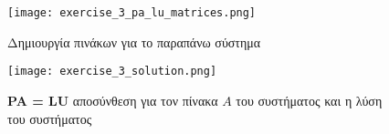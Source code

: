 \documentclass[First Project.tex]{subfiles}
\begin{document}
\begin{figure}[h!]
    \centering
    \captionsetup{justification=centering}
    \begin{center}
        \texttt{[image: exercise\_3\_pa\_lu\_matrices.png]}    
        \caption{ Δημιουργία πινάκων για το παραπάνω σύστημα }
    \end{center}
\end{figure} 
\begin{figure}[h!]
    \centering
    \captionsetup{justification=centering}
    \begin{center}
        \texttt{[image: exercise\_3\_solution.png]}    
        \caption{ \textlatin{\textbf{ PA = LU}} αποσύνθεση για τον πίνακα $Α$ του συστήματος και η λύση του συστήματος }
    \end{center}
\end{figure} 
\end{document}
